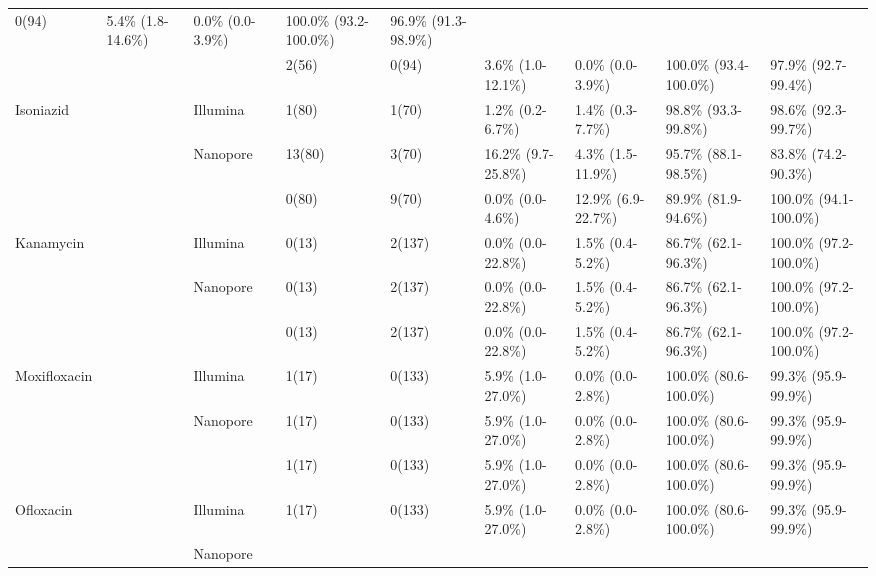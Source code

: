 \begin{table}
{\begin{tabular}{|l|l|l|l|l|l|l|l|l|}
  0(94) &
  5.4\% (1.8-14.6\%) &
  0.0\% (0.0-3.9\%) &
  100.0\% (93.2-100.0\%) &
  96.9\% (91.3-98.9\%) \\ \cline{2-2} \cline{4-9} 
 &
  \mykrobe{} &
   &
  2(56) &
  0(94) &
  3.6\% (1.0-12.1\%) &
  0.0\% (0.0-3.9\%) &
  100.0\% (93.4-100.0\%) &
  97.9\% (92.7-99.4\%) \\ \hline
\multirow{3}{*}{Isoniazid} &
  \multirow{2}{*}{\drprg{}} &
  Illumina &
  1(80) &
  1(70) &
  1.2\% (0.2-6.7\%) &
  1.4\% (0.3-7.7\%) &
  98.8\% (93.3-99.8\%) &
  98.6\% (92.3-99.7\%) \\ \cline{3-9} 
 &
   &
  \multirow{2}{*}{Nanopore} &
  13(80) &
  3(70) &
  16.2\% (9.7-25.8\%) &
  4.3\% (1.5-11.9\%) &
  95.7\% (88.1-98.5\%) &
  83.8\% (74.2-90.3\%) \\ \cline{2-2} \cline{4-9} 
 &
  \mykrobe{} &
   &
  0(80) &
  9(70) &
  0.0\% (0.0-4.6\%) &
  12.9\% (6.9-22.7\%) &
  89.9\% (81.9-94.6\%) &
  100.0\% (94.1-100.0\%) \\ \hline
\multirow{3}{*}{Kanamycin} &
  \multirow{2}{*}{\drprg{}} &
  Illumina &
  0(13) &
  2(137) &
  0.0\% (0.0-22.8\%) &
  1.5\% (0.4-5.2\%) &
  86.7\% (62.1-96.3\%) &
  100.0\% (97.2-100.0\%) \\ \cline{3-9} 
 &
   &
  \multirow{2}{*}{Nanopore} &
  0(13) &
  2(137) &
  0.0\% (0.0-22.8\%) &
  1.5\% (0.4-5.2\%) &
  86.7\% (62.1-96.3\%) &
  100.0\% (97.2-100.0\%) \\ \cline{2-2} \cline{4-9} 
 &
  \mykrobe{} &
   &
  0(13) &
  2(137) &
  0.0\% (0.0-22.8\%) &
  1.5\% (0.4-5.2\%) &
  86.7\% (62.1-96.3\%) &
  100.0\% (97.2-100.0\%) \\ \hline
\multirow{3}{*}{Moxifloxacin} &
  \multirow{2}{*}{\drprg{}} &
  Illumina &
  1(17) &
  0(133) &
  5.9\% (1.0-27.0\%) &
  0.0\% (0.0-2.8\%) &
  100.0\% (80.6-100.0\%) &
  99.3\% (95.9-99.9\%) \\ \cline{3-9} 
 &
   &
  \multirow{2}{*}{Nanopore} &
  1(17) &
  0(133) &
  5.9\% (1.0-27.0\%) &
  0.0\% (0.0-2.8\%) &
  100.0\% (80.6-100.0\%) &
  99.3\% (95.9-99.9\%) \\ \cline{2-2} \cline{4-9} 
 &
  \mykrobe{} &
   &
  1(17) &
  0(133) &
  5.9\% (1.0-27.0\%) &
  0.0\% (0.0-2.8\%) &
  100.0\% (80.6-100.0\%) &
  99.3\% (95.9-99.9\%) \\ \hline
\multirow{3}{*}{Ofloxacin} &
  \multirow{2}{*}{\drprg{}} &
  Illumina &
  1(17) &
  0(133) &
  5.9\% (1.0-27.0\%) &
  0.0\% (0.0-2.8\%) &
  100.0\% (80.6-100.0\%) &
  99.3\% (95.9-99.9\%) \\ \cline{3-9} 
 &
   &
  \multirow{2}{*}{Nanopore} &

\end{tabular}}
\end{table}

